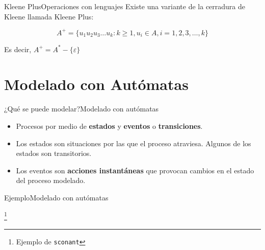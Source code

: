 \documentclass[spanish, handout]{beamer}
\newcommand\blfootnote[1]{%
  \begingroup
  \renewcommand\thefootnote{}\footnote{#1}%
  \addtocounter{footnote}{-1}%
  \endgroup
}
\begin{document}
\begin{frame}{Kleene Plus}{Operaciones con lenguajes}
    Existe una variante de la cerradura de Kleene llamada \alert{Kleene Plus}: \pause

    \bigskip

    \begin{definition}
        \[A^{+} = \{u_1 u_2 u_3 \dots u_k : k \geq 1, u_i \in A, i = 1, 2, 3, \dots , k\}\]
    \end{definition} \pause

    \bigskip

    Es decir, $A^{+} = A^{*} - \{\varepsilon\}$
\end{frame}

\section{Modelado con Autómatas}
\label{sec:modeling}

\begin{frame}{¿Qué se puede modelar?}{Modelado con autómatas}

    \begin{itemize}
        \itemsep1.5ex
        \item Procesos por medio de \textbf{estados} y \textbf{eventos} o \textbf{transiciones}. \pause
        \item Los estados son situaciones por las que el proceso atraviesa. Algunos de los estados son transitorios. \pause
        \item Los eventos son \textbf{acciones instantáneas} que provocan cambios en el estado del proceso modelado.
    \end{itemize}

\end{frame}

\begin{frame}{Ejemplo}{Modelado con autómatas}
    \begin{center}
    \end{center}
    \blfootnote{Ejemplo de \texttt{sconant}}
\end{frame}
\end{document}
